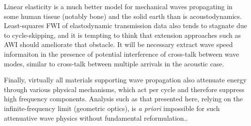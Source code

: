 Linear elasticity is a much better model for mechanical waves
propagating in some human tissue (notably bone) and the solid earth
than is acoustodynamics. Least-squares FWI of elastodynamic
transmission data also tends to stagnate due to cycle-skipping, and it
is tempting to think that extension approaches such as AWI should
ameliorate that obstacle. It will be necessary extract wave speed
informaiton in the presence of potential interference of cross-talk
between wave modes, similar to cross-talk between multiple arrivals in
the acoustic case.

Finally, virtually all materials supporting wave propagation also
attenuate energy through various physical mechanisms, which act per
cycle and therefore suppress high frequency components. Analysis such
as that presented here, relying on the infinite-frequency limit
(geometric optics), is {\em a priori} impossible for such attenuative
wave physics without fundamental
reformulation..




